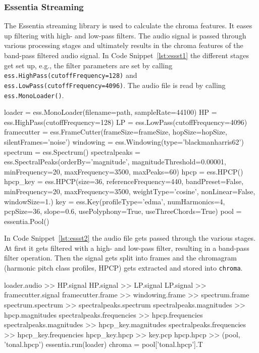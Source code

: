 \subsubsection{Essentia Streaming}

\noindent The Essentia streaming library is used to calculate the chroma features. It eases up filtering with high- and low-pass filters. The audio signal is passed through various processing stages and ultimately results in the chroma features of the band-pass filtered audio signal. In Code Snippet~\ref{lst:essst1} the different stages get set up, e.g., the filter parameters are set by calling \lstinline{ess.HighPass(cutoffFrequency=128)} and \lstinline{ess.LowPass(cutoffFrequency=4096)}. The audio file is read by calling \lstinline{ess.MonoLoader()}.

\begin{pythonCode}[frame=single,label={lst:essst1},caption={Essentia streaming},captionpos=b]
loader = ess.MonoLoader(filename=path, sampleRate=44100)
HP = ess.HighPass(cutoffFrequency=128)
LP = ess.LowPass(cutoffFrequency=4096)
framecutter = ess.FrameCutter(frameSize=frameSize, hopSize=hopSize, silentFrames='noise')
windowing = ess.Windowing(type='blackmanharris62')
spectrum = ess.Spectrum()
spectralpeaks = ess.SpectralPeaks(orderBy='magnitude', magnitudeThreshold=0.00001, minFrequency=20, maxFrequency=3500, maxPeaks=60)
hpcp = ess.HPCP()
hpcp_key = ess.HPCP(size=36, referenceFrequency=440, bandPreset=False, minFrequency=20, maxFrequency=3500, weightType='cosine', nonLinear=False, windowSize=1.)
key = ess.Key(profileType='edma', numHarmonics=4, pcpSize=36, slope=0.6, usePolyphony=True, useThreeChords=True)
pool = essentia.Pool()
\end{pythonCode}	

\noindent In Code Snippet~\ref{lst:essst2} the audio file gets passed through the various stages. At first it gets filtered with a high- and low-pass filter, resulting in a band-pass filter operation. Then the signal gets split into frames and the chromagram (harmonic pitch class profiles, HPCP) gets extracted and stored into \lstinline{chroma}.

\begin{pythonCode}[frame=single,label={lst:essst2},caption={Essentia streaming},captionpos=b]
loader.audio >> HP.signal
HP.signal >> LP.signal
LP.signal >> framecutter.signal    
framecutter.frame >> windowing.frame >> spectrum.frame
spectrum.spectrum >> spectralpeaks.spectrum
spectralpeaks.magnitudes >> hpcp.magnitudes
spectralpeaks.frequencies >> hpcp.frequencies
spectralpeaks.magnitudes >> hpcp_key.magnitudes
spectralpeaks.frequencies >> hpcp_key.frequencies
hpcp_key.hpcp >> key.pcp
hpcp.hpcp >> (pool, 'tonal.hpcp')
essentia.run(loader)
chroma = pool['tonal.hpcp'].T
\end{pythonCode}	

